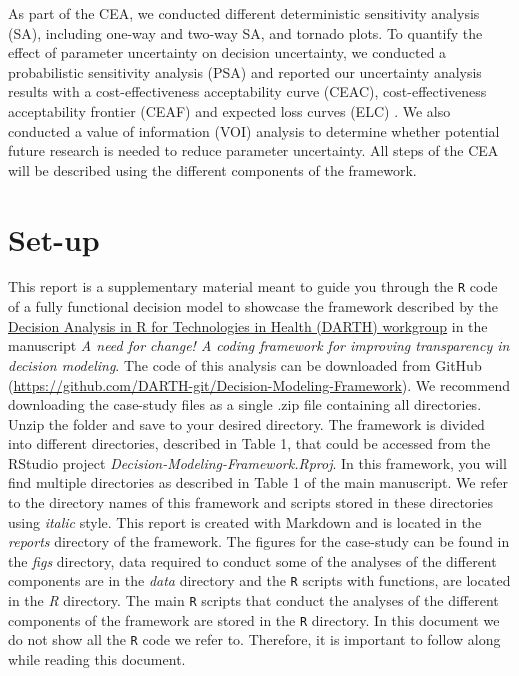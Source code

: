 \documentclass[]{book}
\begin{document}
As part of the CEA, we conducted different deterministic sensitivity analysis (SA), including one-way and two-way SA, and tornado plots. To quantify the effect of parameter uncertainty on decision uncertainty, we conducted a probabilistic sensitivity analysis (PSA) and reported our uncertainty analysis results with a cost-effectiveness acceptability curve (CEAC), cost-effectiveness acceptability frontier (CEAF) and expected loss curves (ELC) \citep{Alarid-Escudero2019}. We also conducted a value of information (VOI) analysis to determine whether potential future research is needed to reduce parameter uncertainty. All steps of the CEA will be described using the different components of the framework.

\hypertarget{set-up}{%
\section*{Set-up}\label{set-up}}

This report is a supplementary material meant to guide you through the \texttt{R} code of a fully functional decision model to showcase the framework described by the \href{http://darthworkgroup.com/}{Decision Analysis in R for Technologies in Health (DARTH) workgroup} in the manuscript \emph{A need for change! A coding framework for improving transparency in decision modeling}. The code of this analysis can be downloaded from GitHub (\url{https://github.com/DARTH-git/Decision-Modeling-Framework}). We recommend downloading the case-study files as a single .zip file containing all directories. Unzip the folder and save to your desired directory. The framework is divided into different directories, described in Table 1, that could be accessed from the RStudio project \emph{Decision-Modeling-Framework.Rproj}. In this framework, you will find multiple directories as described in Table 1 of the main manuscript. We refer to the directory names of this framework and scripts stored in these directories using \emph{italic} style. This report is created with Markdown and is located in the \emph{reports} directory of the framework. The figures for the case-study can be found in the \emph{figs} directory, data required to conduct some of the analyses of the different components are in the \emph{data} directory and the \texttt{R} scripts with functions, are located in the \emph{R} directory. The main \texttt{R} scripts that conduct the analyses of the different components of the framework are stored in the \texttt{R} directory. In this document we do not show all the \texttt{R} code we refer to. Therefore, it is important to follow along while reading this document.
\end{document}
